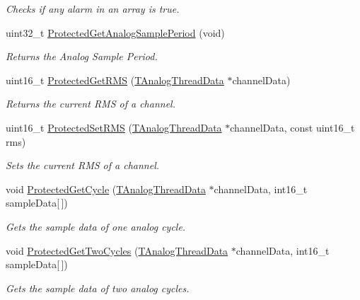 \begin{DoxyCompactItemize}
\begin{DoxyCompactList}\small\item\em Checks if any alarm in an array is true. \end{DoxyCompactList}\item 
uint32\+\_\+t \hyperlink{group__main__module_ga30c3cdc49b63ff8d4b2c0ef1e70bc108}{Protected\+Get\+Analog\+Sample\+Period} (void)
\begin{DoxyCompactList}\small\item\em Returns the Analog Sample Period. \end{DoxyCompactList}\item 
uint16\+\_\+t \hyperlink{group__main__module_gadbebeafdb3e77340dbd2d75495f7a879}{Protected\+Get\+R\+M\+S} (\hyperlink{_v_r_r_8h_ae5f40603a116adc42529ceedda6942c7}{T\+Analog\+Thread\+Data} $\ast$channel\+Data)
\begin{DoxyCompactList}\small\item\em Returns the current R\+M\+S of a channel. \end{DoxyCompactList}\item 
uint16\+\_\+t \hyperlink{group__main__module_gae89738835c20ca367e44b56d544507f5}{Protected\+Set\+R\+M\+S} (\hyperlink{_v_r_r_8h_ae5f40603a116adc42529ceedda6942c7}{T\+Analog\+Thread\+Data} $\ast$channel\+Data, const uint16\+\_\+t rms)
\begin{DoxyCompactList}\small\item\em Sets the current R\+M\+S of a channel. \end{DoxyCompactList}\item 
void \hyperlink{group__main__module_ga2eb25994db6055485099e1c3088154f5}{Protected\+Get\+Cycle} (\hyperlink{_v_r_r_8h_ae5f40603a116adc42529ceedda6942c7}{T\+Analog\+Thread\+Data} $\ast$channel\+Data, int16\+\_\+t sample\+Data\mbox{[}$\,$\mbox{]})
\begin{DoxyCompactList}\small\item\em Gets the sample data of one analog cycle. \end{DoxyCompactList}\item 
void \hyperlink{group__main__module_ga7f941dc4a9429f548c9b2c2f4fa6e16d}{Protected\+Get\+Two\+Cycles} (\hyperlink{_v_r_r_8h_ae5f40603a116adc42529ceedda6942c7}{T\+Analog\+Thread\+Data} $\ast$channel\+Data, int16\+\_\+t sample\+Data\mbox{[}$\,$\mbox{]})
\begin{DoxyCompactList}\small\item\em Gets the sample data of two analog cycles. \end{DoxyCompactList}\item 

\end{DoxyCompactItemize}
